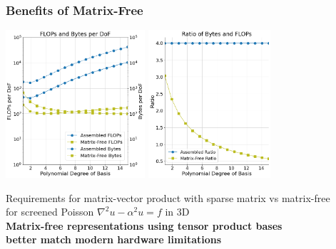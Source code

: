 \documentclass{beamer}
\begin{document}
\begin{frame}
\begin{center}
\frametitle{Benefits of Matrix-Free}

\includegraphics[height=5.5cm]{../img/assembledVsMatrixFree_tall}
\hspace{1cm}
\includegraphics[height=5.5cm]{../img/assembledVsMatrixFreeBalance_tall}

{\small Requirements for matrix-vector product with sparse matrix vs matrix-free\\ for screened Poisson $\nabla^2 u - \alpha^2 u = f$ in 3D}\\

{\bf Matrix-free representations using tensor product bases\\better match modern hardware limitations}

\end{center}
\end{frame}

\end{document}
